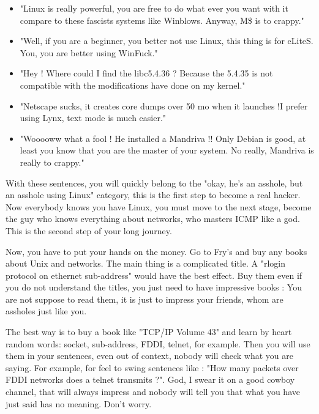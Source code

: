 \begin{itemize}
	\item "Linux is really powerful, you are free to do what ever you want with it compare to these fascists systems like Winblows. Anyway, M\$ is to crappy."

	\item "Well, if you are a beginner, you better not use Linux, this thing is for eLiteS. You, you are better using WinFuck."

	\item "Hey ! Where could I find the libc5.4.36 ? Because the 5.4.35 is not compatible with the modifications have done on my kernel."

	\item "Netscape sucks, it creates core dumps over 50 mo when it launches !I prefer using Lynx, text mode is much easier."

	\item "Wooooww what a fool ! He installed a Mandriva !! Only Debian is good, at least you know that you are the master of your system. No really, Mandriva is really to crappy."
\end{itemize}

With these sentences, you will quickly belong to the "okay, he's an asshole, but an asshole using Linux" category, this is the first step to become a real hacker. Now everybody knows you have Linux, you must move to the next stage, become the guy who knows everything about networks, who masters ICMP like a god. This is the second step of your long journey.

Now, you have to put your hands on the money. Go to Fry's and buy any books about Unix and networks. The main thing is a complicated title. A "rlogin protocol on ethernet sub-address" would have the best effect. Buy them even if you do not understand the titles, you just need to have impressive books : You are not suppose to read them, it is just to impress your friends, whom are assholes just like you.

The best way is to buy a book like "TCP/IP Volume 43" and learn by heart random words: socket, sub-address, FDDI, telnet, for example. Then you will use them in your sentences, even out of context, nobody will check what you are saying. For example, for feel to swing sentences like : "How many packets over FDDI networks does a telnet transmits ?". God, I swear it on a good cowboy channel, that will always impress and nobody will tell you that what you have just said has no meaning. Don't worry.

